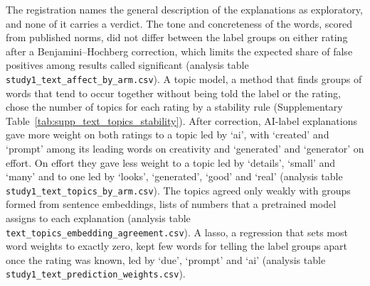 The registration names the general description of the explanations as exploratory, and none of it carries a verdict. The tone and concreteness of the words, scored from published norms, did not differ between the label groups on either rating after a Benjamini--Hochberg correction, which limits the expected share of false positives among results called significant (analysis table \nolinkurl{study1_text_affect_by_arm.csv}). A topic model, a method that finds groups of words that tend to occur together without being told the label or the rating, chose the number of topics for each rating by a stability rule (Supplementary Table~\ref{tab:supp_text_topics_stability}). After correction, AI-label explanations gave more weight on both ratings to a topic led by `ai', with `created' and `prompt' among its leading words on creativity and `generated' and `generator' on effort. On effort they gave less weight to a topic led by `details', `small' and `many' and to one led by `looks', `generated', `good' and `real' (analysis table \nolinkurl{study1_text_topics_by_arm.csv}). The topics agreed only weakly with groups formed from sentence embeddings, lists of numbers that a pretrained model assigns to each explanation (analysis table \nolinkurl{text_topics_embedding_agreement.csv}). A lasso, a regression that sets most word weights to exactly zero, kept few words for telling the label groups apart once the rating was known, led by `due', `prompt' and `ai' (analysis table \nolinkurl{study1_text_prediction_weights.csv}).


\endgroup
